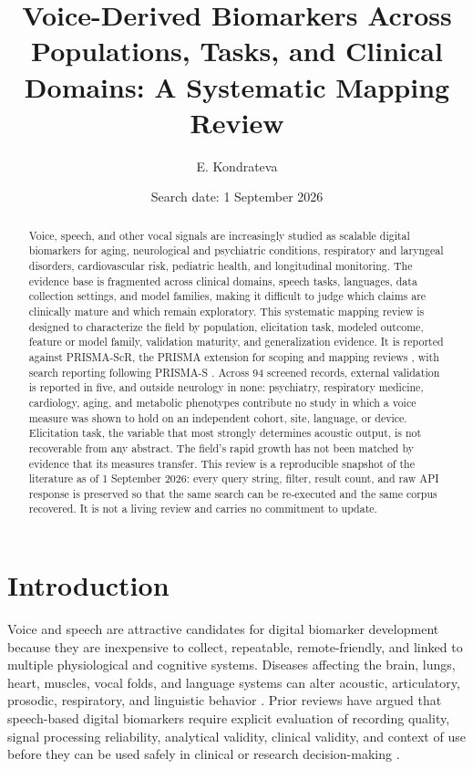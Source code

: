 \documentclass[11pt]{article}
\title{Voice-Derived Biomarkers Across Populations, Tasks, and Clinical Domains: A Systematic Mapping Review}
\author{E. Kondrateva}
\date{Search date: 1 September 2026}
\begin{document}
\maketitle

\begin{abstract}
Voice, speech, and other vocal signals are increasingly studied as scalable digital biomarkers for aging, neurological and psychiatric conditions, respiratory and laryngeal disorders, cardiovascular risk, pediatric health, and longitudinal monitoring. The evidence base is fragmented across clinical domains, speech tasks, languages, data collection settings, and model families, making it difficult to judge which claims are clinically mature and which remain exploratory. This systematic mapping review is designed to characterize the field by population, elicitation task, modeled outcome, feature or model family, validation maturity, and generalization evidence. It is reported against PRISMA-ScR, the PRISMA extension for scoping and mapping reviews \citep{tricco2018prismascr}, with search reporting following PRISMA-S \citep{rethlefsen2021prismas}. Across 94 screened records, external validation is reported in five, and outside neurology in none: psychiatry, respiratory medicine, cardiology, aging, and metabolic phenotypes contribute no study in which a voice measure was shown to hold on an independent cohort, site, language, or device. Elicitation task, the variable that most strongly determines acoustic output, is not recoverable from any abstract. The field's rapid growth has not been matched by evidence that its measures transfer. This review is a reproducible snapshot of the literature as of 1 September 2026: every query string, filter, result count, and raw API response is preserved so that the same search can be re-executed and the same corpus recovered. It is not a living review and carries no commitment to update.
\end{abstract}

\section{Introduction}

Voice and speech are attractive candidates for digital biomarker development because they are inexpensive to collect, repeatable, remote-friendly, and linked to multiple physiological and cognitive systems. Diseases affecting the brain, lungs, heart, muscles, vocal folds, and language systems can alter acoustic, articulatory, prosodic, respiratory, and linguistic behavior \citep{fagherazzi2021voice}. Prior reviews have argued that speech-based digital biomarkers require explicit evaluation of recording quality, signal processing reliability, analytical validity, clinical validity, and context of use before they can be used safely in clinical or research decision-making \citep{robin2020evaluation,babrak2019traditional}.
\end{document}
